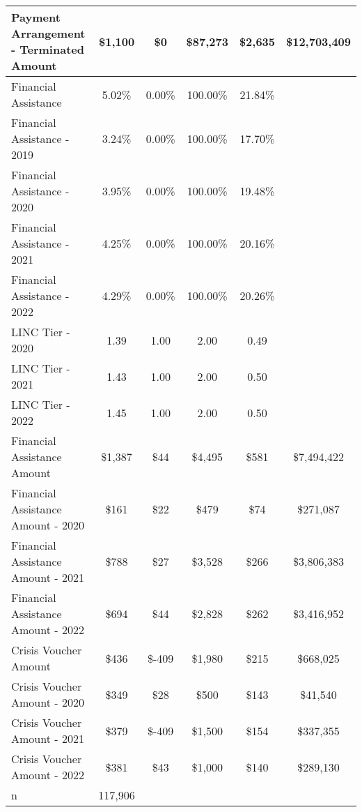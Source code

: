 \begin{tabular}{l|c|c|c|c|c}
\quad Payment Arrangement - Terminated Amount & \$1,100 & \$0 & \$87,273 & \$2,635 & \$12,703,409 \\
\midrule 
Financial Assistance & 5.02\% & 0.00\% & 100.00\% & 21.84\% \\
\quad Financial Assistance - 2019 & 3.24\% & 0.00\% & 100.00\% & 17.70\% \\
\quad Financial Assistance - 2020 & 3.95\% & 0.00\% & 100.00\% & 19.48\% \\
\quad Financial Assistance - 2021 & 4.25\% & 0.00\% & 100.00\% & 20.16\% \\
\quad Financial Assistance - 2022 & 4.29\% & 0.00\% & 100.00\% & 20.26\% \\
\midrule 
LINC Tier - 2020 & 1.39 & 1.00 & 2.00 & 0.49 \\
LINC Tier - 2021 & 1.43 & 1.00 & 2.00 & 0.50 \\
LINC Tier - 2022 & 1.45 & 1.00 & 2.00 & 0.50 \\
\midrule 
Financial Assistance Amount & \$1,387 & \$44 & \$4,495 & \$581 & \$7,494,422 \\
\quad Financial Assistance Amount - 2020 & \$161 & \$22 & \$479 & \$74 & \$271,087 \\
\quad Financial Assistance Amount - 2021 & \$788 & \$27 & \$3,528 & \$266 & \$3,806,383 \\
\quad Financial Assistance Amount - 2022 & \$694 & \$44 & \$2,828 & \$262 & \$3,416,952 \\
\midrule 
Crisis Voucher Amount & \$436 & \$-409 & \$1,980 & \$215 & \$668,025 \\
\quad Crisis Voucher Amount - 2020 & \$349 & \$28 & \$500 & \$143 & \$41,540 \\
\quad Crisis Voucher Amount - 2021 & \$379 & \$-409 & \$1,500 & \$154 & \$337,355 \\
\quad Crisis Voucher Amount - 2022 & \$381 & \$43 & \$1,000 & \$140 & \$289,130 \\
\midrule 
n & 117,906 &  &  &  &  \\
\midrule 
\bottomrule 
\end{tabular}
